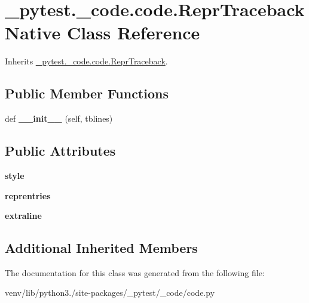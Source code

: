 \hypertarget{class__pytest_1_1__code_1_1code_1_1_repr_traceback_native}{}\section{\+\_\+pytest.\+\_\+code.\+code.\+Repr\+Traceback\+Native Class Reference}
\label{class__pytest_1_1__code_1_1code_1_1_repr_traceback_native}


Inherits \hyperlink{class__pytest_1_1__code_1_1code_1_1_repr_traceback}{\+\_\+pytest.\+\_\+code.\+code.\+Repr\+Traceback}.

\subsection*{Public Member Functions}
\begin{DoxyCompactItemize}
\item 
\mbox{\label{class__pytest_1_1__code_1_1code_1_1_repr_traceback_native_ace57d1ca181e657e8560b0c2721bb8b6}} 
def {\bfseries \+\_\+\+\_\+init\+\_\+\+\_\+} (self, tblines)
\end{DoxyCompactItemize}
\subsection*{Public Attributes}
\begin{DoxyCompactItemize}
\item 
\mbox{\label{class__pytest_1_1__code_1_1code_1_1_repr_traceback_native_a8999584cf06ff99b3fea611ffaae6dc8}} 
{\bfseries style}
\item 
\mbox{\label{class__pytest_1_1__code_1_1code_1_1_repr_traceback_native_adb25b6849649d4f3e2e4e8cd010aafae}} 
{\bfseries reprentries}
\item 
\mbox{\label{class__pytest_1_1__code_1_1code_1_1_repr_traceback_native_ac09367e3f45569aca5f1b4b2b8087105}} 
{\bfseries extraline}
\end{DoxyCompactItemize}
\subsection*{Additional Inherited Members}


The documentation for this class was generated from the following file\+:\begin{DoxyCompactItemize}
\item 
venv/lib/python3./site-\/packages/\+\_\+pytest/\+\_\+code/code.\+py\end{DoxyCompactItemize}
